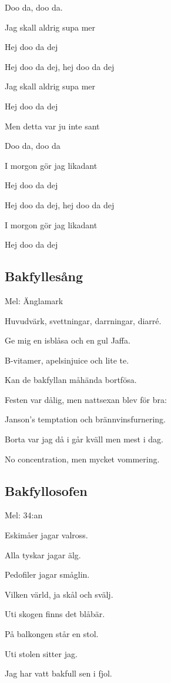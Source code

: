 Doo da, doo da.

Jag skall aldrig supa mer\bigskip


Hej doo da dej

Hej doo da dej, hej doo da dej

Jag skall aldrig supa mer

Hej doo da dej\bigskip


Men detta var ju inte sant

Doo da, doo da

I morgon gör jag likadant\bigskip


Hej doo da dej

Hej doo da dej, hej doo da dej

I morgon gör jag likadant

Hej doo da dej 


\subsection{\textbf{Bakfyllesång}}

Mel: Änglamark\bigskip

Huvudvärk, svettningar, darrningar, diarré.

Ge mig en isblåsa och en gul Jaffa.

B-vitamer, apelsinjuice och lite te.

Kan de bakfyllan måhända bortfösa.

Festen var dålig, men nattsexan blev för bra:

Janson's temptation och brännvinsfurnering.

Borta var jag då i går kväll men mest i dag.

No concentration, men mycket vommering. 

\subsection{\textbf{Bakfyllosofen}}

Mel: 34:an\bigskip


Eskimåer jagar valross.

Alla tyskar jagar älg.

Pedofiler jagar småglin.

Vilken värld, ja skål och svälj.\bigskip


Uti skogen finns det blåbär.

På balkongen står en stol.

Uti stolen sitter jag.

Jag har vatt bakfull sen i fjol.\bigskip


